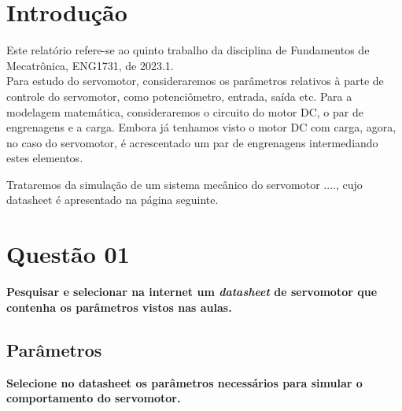 \documentclass[a4paper, 12pt]{article}
\begin{document}
\newpage


\newpage

\listoffigures
\thispagestyle{empty}

\newpage

\newpage

\thispagestyle{empty}

\newpage
\section{Introdução}
Este relatório refere-se ao quinto trabalho da disciplina de Fundamentos de Mecatrônica, ENG1731, de 2023.1. \\

Para estudo do servomotor, consideraremos os parâmetros relativos à parte de controle do servomotor, como potenciômetro, entrada, saída etc. Para a modelagem matemática, consideraremos o circuito do motor DC, o par de engrenagens e a carga. Embora já tenhamos visto o motor DC com carga, agora, no caso do servomotor, é acrescentado um par de engrenagens intermediando estes elementos. 

Trataremos da simulação de um sistema mecânico do servomotor ...., cujo datasheet é apresentado na página seguinte.\\

\newpage



\newpage

\section{Questão 01}
\textbf{Pesquisar e selecionar na internet um \textit{datasheet} de servomotor que contenha os parâmetros vistos nas aulas.} \\

\subsection{Parâmetros}
\textbf{Selecione no datasheet os parâmetros necessários para simular o comportamento do servomotor.} \\
\end{document}
